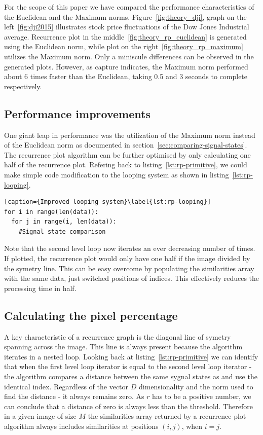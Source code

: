 \documentclass[a4paper,12pt,fleqn]{article}
\begin{document}
For the scope of this paper we have compared the performance characteristics of the Euclidean and the Maximum norms.
Figure~\ref{fig:theory_dji}, graph on the left~\ref{fig:dji2015} illustrates stock price fluctuations of the Dow Jones Industrial average.
Recurrence plot in the middle~\ref{fig:theory_rp_euclidean} is generated using the Euclidean norm, while plot on the right~\ref{fig:theory_rp_maximum} utilizes the Maximum norm.
Only a miniscule differences can be observed in the generated plots.
However, as capture indicates, the Maximum norm performed about 6 times faster than the Euclidean, taking 0.5 and 3 seconds to complete respectively.


\subsection{Performance improvements}
One giant leap in performance was the utilization of the Maximum norm instead of the Euclidean norm as documented in section~\ref{sec:comparing-signal-states}.
The recurrence plot algorithm can be further optimised by only calculating one half of the recurrence plot.
Refering back to listing~\ref{lst:rp-primitive}, we could make simple code modification to the looping system as shown in listing~\ref{lst:rp-looping}.
\begin{lstlisting}[caption={Improved looping system}\label{lst:rp-looping}]
for i in range(len(data)):
  for j in range(i, len(data)):
    #Signal state comparison
\end{lstlisting}
Note that the second level loop now iterates an ever decreasing number of times.
If plotted, the recurrence plot would only have one half if the image divided by the symetry line.
This can be easy overcome by populating the similarities array with the same data, just switched positions of indices.
This effectively reduces the processing time in half. 


\subsection{Calculating the pixel percentage}
A key characteristic of a recurrence graph is the diagonal line of symetry spanning across the image.
This line is always present because the algorithm iterates in a nested loop.
Looking back at listing~\ref{lst:rp-primitive} we can identify that when the first level loop iterator  is equal to the second level loop iterator  - the algorithm compares a distance between the same sygnal states as  and  use the identical index.
Regardless of the vector $D$ dimensionality and the norm used to find the distance - it always remains zero.
As $r$ has to be a positive number, we can conclude that a distance of zero is always less than the threshold.
Therefore in a given image of size $M$ the similarities array returned by a recurrence plot algorithm always includes similarities at positions $(i, j)$, when $i = j$.
\end{document}
